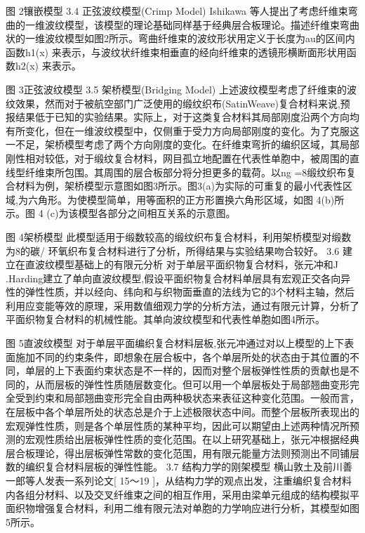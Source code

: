 图 2镶嵌模型
3.4  正弦波纹模型(Crimp Model)
Ishikawa 等人提出了考虑纤维束弯曲的一维波纹模型，该模型的理论基础同样基于经典层合板理论。描述纤维束弯曲状的一维波纹模型如图2所示。弯曲纤维束的波纹形状用定义于长度为au的区间内函数h1(x) 来表示，与波纹状纤维束相垂直的经向纤维束的透镜形横断面形状用函数h2(x) 来表示。
 
图 3正弦波纹模型
3.5  架桥模型(Bridging Model)
上述波纹模型考虑了纤维束的波纹效果，然而对于被航空部门广泛使用的缎纹织布(SatinWeave)复合材料来说,预报结果低于已知的实验结果。实际上，对于这类复合材料其局部刚度沿两个方向均有所变化，但在一维波纹模型中，仅侧重于受力方向局部刚度的变化。为了克服这一不足，架桥模型考虑了两个方向刚度的变化。在纤维束弯折的编织区域，其局部刚性相对较低，对于缎纹复合材料，网目孤立地配置在代表性单胞中，被周围的直线型纤维束所包围。其周围的层合板部分将分担更多的载荷。以ng =8缎纹织布复合材料为例，架桥模型示意图如图3所示。图3(a)为实际的可重复的最小代表性区域,为六角形。为使模型简单，用等面积的正方形置换六角形区域，如图 4(b)所示。图 4 (c)为该模型各部分之间相互关系的示意图。
 
图 4架桥模型
此模型适用于缎数较高的缎纹织布复合材料，利用架桥模型对缎数为8的碳/ 环氧织布复合材料进行了分析，所得结果与实验结果吻合较好。
3.6  建立在直波纹模型基础上的有限元分析
对于单层平面织物复合材料，张元冲和J .Harding建立了单向直波纹模型,假设平面织物复合材料单层具有宏观正交各向异性的弹性性质，并以经向、纬向和与织物面垂直的法线为它的3个材料主轴，然后利用应变能等效的原理，采用数值细观力学的分析方法，通过有限元计算，分析了平面织物复合材料的机械性能。其单向波纹模型和代表性单胞如图4所示。
 
图 5直波纹模型
对于单层平面编织复合材料层板,张元冲通过对以上模型的上下表面施加不同的约束条件，即想象在层合板中，各个单层所处的状态由于其位置的不同，单层的上下表面约束状态是不一样的，因而对整个层板弹性性质的贡献也是不同的，从而层板的弹性性质随层数变化。但可以用一个单层板处于局部翘曲变形完全受到约束和局部翘曲变形完全自由两种极状态来表征这种变化范围。一般而言，在层板中各个单层所处的状态总是介于上述极限状态中间。而整个层板所表现出的宏观弹性性质，则是各个单层性质的某种平均，因此可以期望由上述两种情况所预测的宏观性质给出层板弹性性质的变化范围。在以上研究基础上，张元冲根据经典层合板理论，得出层板弹性常数的变化范围，用有限元能量方法则预测出不同铺层数的编织复合材料层板的弹性性能。
3.7  结构力学的刚架模型
横山敦土及前川善一郎等人发表一系列论文[ 15～19 ]，从结构力学的观点出发，注重编织复合材料内各组分材料、以及交叉纤维束之间的相互作用，采用由梁单元组成的结构模拟平面织物增强复合材料，利用二维有限元法对单胞的力学响应进行分析，其模型如图5所示。
 
